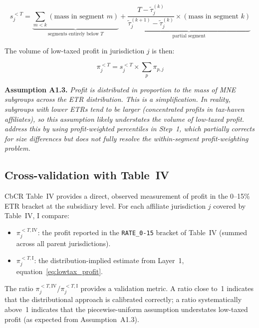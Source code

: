 \documentclass[11pt,a4paper]{article}
\newcommand{\code}[1]{\texttt{#1}}
\newcommand{\assumption}[2]{\noindent\textbf{Assumption #1.} \textit{#2}\medskip}
\begin{document}
\begin{equation}\label{eq:lowtax_share_pw}
s_j^{<T} = \underbrace{\sum_{m < k} (\text{mass in segment } m)}_{\text{segments entirely below } T} + \underbrace{\frac{T - \tilde{\tau}_j^{(k)}}{\tilde{\tau}_j^{(k+1)} - \tilde{\tau}_j^{(k)}} \times (\text{mass in segment } k)}_{\text{partial segment}}
\end{equation}

The volume of low-taxed profit in jurisdiction $j$ is then:

\begin{equation}\label{eq:lowtax_profit}
\pi_j^{<T} = s_j^{<T} \times \sum_p \pi_{p,j}
\end{equation}

\assumption{A1.3}{Profit is distributed in proportion to the mass of MNE subgroups across the ETR distribution. This is a simplification. In reality, subgroups with lower ETRs tend to be larger (concentrated profits in tax-haven affiliates), so this assumption likely \emph{understates} the volume of low-taxed profit. \citet{hugger2025} address this by using profit-weighted percentiles in Step~1, which partially corrects for size differences but does not fully resolve the within-segment profit-weighting problem.}

\subsection{Cross-validation with Table~IV}\label{sec:crossval}

CbCR Table~IV provides a direct, observed measurement of profit in the 0--15\% ETR bracket at the subsidiary level. For each affiliate jurisdiction $j$ covered by Table~IV, I compare:

\begin{itemize}
\item $\pi_j^{<T,\text{IV}}$: the profit reported in the \code{RATE\_0-15} bracket of Table~IV (summed across all parent jurisdictions).
\item $\pi_j^{<T,\text{I}}$: the distribution-implied estimate from Layer~1, equation~\eqref{eq:lowtax_profit}.
\end{itemize}

The ratio $\pi_j^{<T,\text{IV}} / \pi_j^{<T,\text{I}}$ provides a validation metric. A ratio close to~1 indicates that the distributional approach is calibrated correctly; a ratio systematically above~1 indicates that the piecewise-uniform assumption understates low-taxed profit (as expected from Assumption~A1.3).
\end{document}
